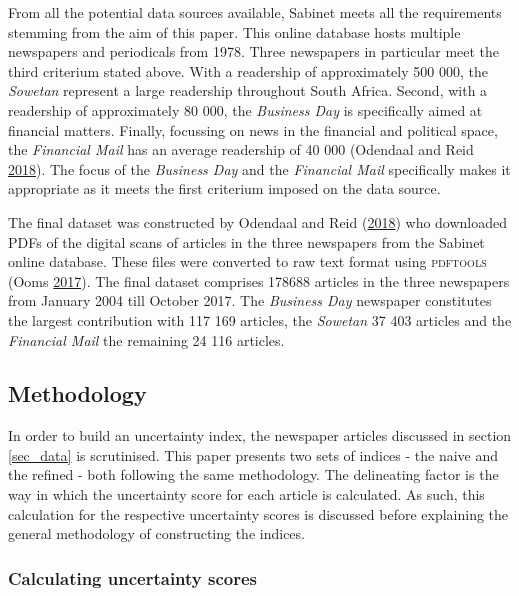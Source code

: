 \documentclass[11pt,preprint, authoryear]{elsarticle}
\numberwithin{equation}{section}
\numberwithin{figure}{section}
\numberwithin{table}{section}
\begin{document}
From all the potential data sources available, Sabinet meets all the
requirements stemming from the aim of this paper. This online database
hosts multiple newspapers and periodicals from 1978. Three newspapers in
particular meet the third criterium stated above. With a readership of
approximately 500 000, the \emph{Sowetan} represent a large readership
throughout South Africa. Second, with a readership of approximately 80
000, the \emph{Business Day} is specifically aimed at financial matters.
Finally, focussing on news in the financial and political space, the
\emph{Financial Mail} has an average readership of 40 000 (Odendaal and
Reid \protect\hyperlink{ref-Odendaal2018}{2018}). The focus of the
\emph{Business Day} and the \emph{Financial Mail} specifically makes it
appropriate as it meets the first criterium imposed on the data source.

The final dataset was constructed by Odendaal and Reid
(\protect\hyperlink{ref-Odendaal2018}{2018}) who downloaded PDFs of the
digital scans of articles in the three newspapers from the Sabinet
online database. These files were converted to raw text format using
\textsc{pdftools} (Ooms \protect\hyperlink{ref-Ooms2017}{2017}). The
final dataset comprises 178688 articles in the three newspapers from
January 2004 till October 2017. The \emph{Business Day} newspaper
constitutes the largest contribution with 117 169 articles, the
\emph{Sowetan} 37 403 articles and the \emph{Financial Mail} the
remaining 24 116 articles.

\subsection{\texorpdfstring{Methodology
\label{sec_method}}{Methodology }}\label{methodology}

In order to build an uncertainty index, the newspaper articles discussed
in section \ref{sec_data} is scrutinised. This paper presents two sets
of indices - the naive and the refined - both following the same
methodology. The delineating factor is the way in which the uncertainty
score for each article is calculated. As such, this calculation for the
respective uncertainty scores is discussed before explaining the general
methodology of constructing the indices.

\subsubsection{\texorpdfstring{Calculating uncertainty scores
\label{ss_uncertaintyscore}}{Calculating uncertainty scores }}\label{calculating-uncertainty-scores}
\end{document}
